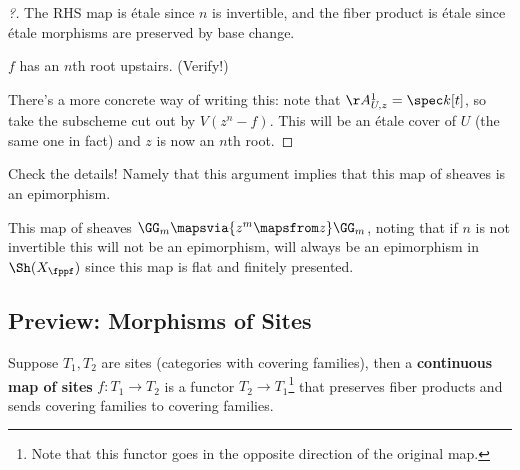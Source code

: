 \begin{example}[?]
\begin{proof}[?]
The RHS map is étale since \(n\) is invertible, and the fiber product is
étale since étale morphisms are preserved by base change.

\begin{claim}

\(f\) has an \(n\)th root upstairs. (Verify!)

\end{claim}

There's a more concrete way of writing this: note that
\(\AA^1_{U, z} = \spec k[t]\), so take the subscheme cut out by
\(V(z^n - f)\). This will be an étale cover of \(U\) (the same one in
fact) and \(z\) is now an \(n\)th root.

\end{proof}

\end{example}

\begin{exercise}[?]

Check the details! Namely that this argument implies that this map of
sheaves is an epimorphism.

\end{exercise}

\begin{remark}

This map of sheaves \(\GG_m \mapsvia{z^m \mapsfrom z} \GG_m\), noting
that if \(n\) is not invertible this will not be an epimorphism, will
always be an epimorphism in \(\Sh(X_\fppf)\) since this map is flat and
finitely presented.

\end{remark}

\hypertarget{preview-morphisms-of-sites}{%
\subsection{Preview: Morphisms of
Sites}\label{preview-morphisms-of-sites}}

\begin{definition}

Suppose \(T_1, T_2\) are sites (categories with covering families), then
a \textbf{continuous map of sites} \(f:T_1 \to T_2\) is a functor
\(T_2 \to T_1\)\footnote{Note that this functor goes in the opposite
  direction of the original map.} that preserves fiber products and
sends covering families to covering families.

\end{definition}

